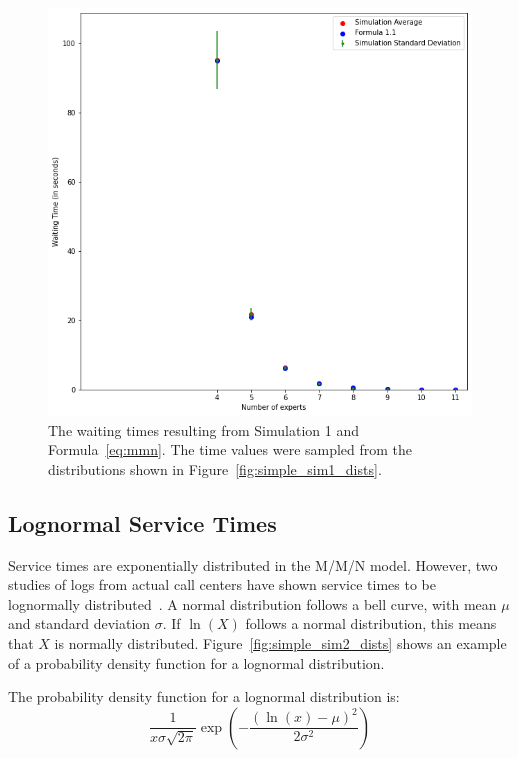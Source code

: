 \begin{figure}[H]
  \includegraphics[width=\textwidth]{figures/montecarlo/independent_calls_expon.png}
  \caption{
    The waiting times resulting from Simulation 1 and Formula~\ref{eq:mmn}.
    The time values were sampled from the distributions shown in
    Figure~\ref{fig:simple_sim1_dists}.
  }\label{fig:simple_sim1_results}
\end{figure}

\subsection{Lognormal Service Times}\label{sec:sim_lognormal}

Service times are exponentially distributed in the M/M/N model.
However, two studies of logs from actual call centers have shown service times
to be lognormally distributed~\cite{queue1, queue2}.
A normal distribution follows a bell curve, with mean $\mu$ and standard
deviation $\sigma$.
If $\ln{(X)}$ follows a normal distribution, this means that $X$ is normally
distributed.
Figure~\ref{fig:simple_sim2_dists} shows an example of a probability density
function for a lognormal distribution.

The probability density function for a lognormal distribution is:
\[
  \frac{1}{x \sigma \sqrt{2 \pi}}
  \exp{\left( - \frac{\left( \ln(x) - \mu \right)^2}{2 \sigma^2} \right)}
\]

